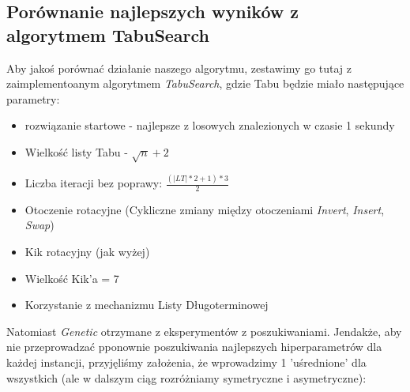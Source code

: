 \documentclass{article}
\begin{document}
\subsection{Porównanie najlepszych wyników z algorytmem TabuSearch}
Aby jakoś porównać działanie naszego algorytmu, zestawimy go tutaj z zaimplementoanym algorytmem \textit{TabuSearch}, gdzie Tabu będzie miało następujące parametry:
\begin{itemize}
	\item rozwiązanie startowe - najlepsze z losowych znalezionych w czasie 1 sekundy
	\item Wielkość listy Tabu - $\sqrt{n} + 2$
	\item Liczba iteracji bez poprawy: $\frac{(|LT| * 2 + 1) * 3}{2}$
	\item Otoczenie rotacyjne (Cykliczne zmiany między otoczeniami \textit{Invert}, \textit{Insert}, \textit{Swap})
	\item Kik rotacyjny (jak wyżej)
	\item Wielkość Kik'a = 7
	\item Korzystanie z mechanizmu Listy Długoterminowej
\end{itemize}
Natomiast \textit{Genetic} otrzymane z eksperymentów z poszukiwaniami. Jendakże, aby nie przeprowadzać pponownie poszukiwania najlepszych hiperparametrów dla każdej instancji, przyjęliśmy założenia, że wprowadzimy 1 'uśrednione' dla wszystkich (ale w dalszym ciąg rozróżniamy symetryczne i asymetryczne):
\end{document}
